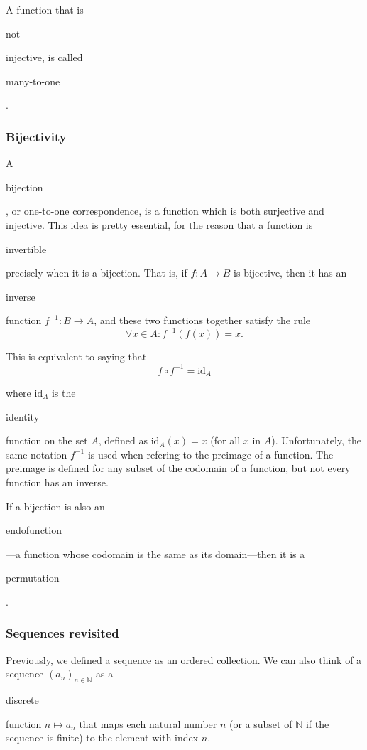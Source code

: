 \documentclass[11pt]{article}
\theoremstyle{plain}
\theoremstyle{definition}
\begin{document}
\noindent A function that is \begin{em}not\end{em} injective, is called \begin{em}many-to-one\end{em}.

\subsubsection*{ Bijectivity}

A \begin{em}bijection\end{em}, or one-to-one correspondence, is a function which is both surjective and injective.
This idea is pretty essential, for the reason that a function is \begin{em}invertible\end{em} precisely when it is a bijection. That is, if $ f : A \to B $ is bijective, then it has an \begin{em}inverse\end{em} function $ f^{-1} : B \to A $, and these two functions together satisfy the rule
$$
  \forall x \in A : f^{-1}(f(x)) = x.
$$

\noindent This is equivalent to saying that
$$
  f \circ f^{-1} = \text{id}_A
$$

\noindent where $ \text{id}_A $ is the \begin{em}identity\end{em} function on the set $ A $, defined as $ \text{id}_A(x) = x $ (for all $ x $ in $ A $).
Unfortunately, the same notation $ f^{-1} $ is used when refering to the preimage of a function. The preimage is defined for any subset of the codomain of a function, but not every function has an inverse.

\begin{center}
  \def\svgwidth{1\columnwidth}
  
\end{center}

\noindent If a bijection is also an \begin{em}endofunction\end{em}---a function whose codomain is the same as its domain---then it is a \begin{em}permutation\end{em}.

\subsubsection*{Sequences revisited}

Previously, we defined a sequence as an ordered collection. We can also think of a sequence $ (a_n)_{n \in \mathbb{N}} $ as a \begin{em}discrete\end{em} function $ n \mapsto a_n $ that maps each natural number $ n $ (or a subset of $ \mathbb{N}$ if the sequence is finite) to the element with index $ n $.
\end{document}
